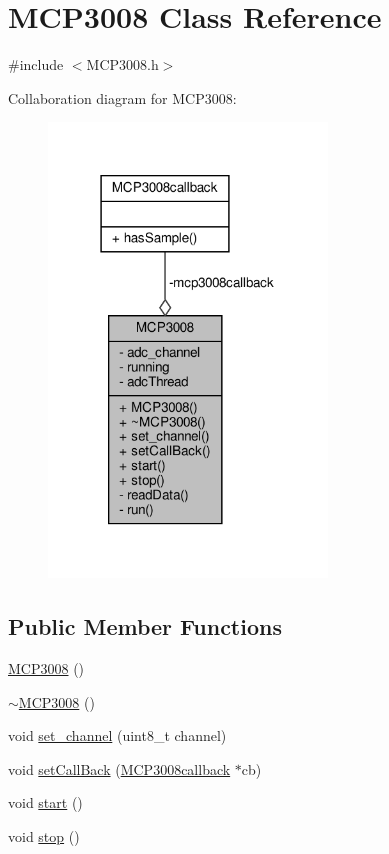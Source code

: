 \hypertarget{classMCP3008}{}\section{M\+C\+P3008 Class Reference}
\label{classMCP3008}


{\ttfamily \#include $<$M\+C\+P3008.\+h$>$}



Collaboration diagram for M\+C\+P3008\+:
\nopagebreak
\begin{figure}[H]
\begin{center}
\leavevmode
\includegraphics[width=210pt]{classMCP3008__coll__graph}
\end{center}
\end{figure}
\subsection*{Public Member Functions}
\begin{DoxyCompactItemize}
\item 
\hyperlink{classMCP3008_a31a9bfe04898e565154413cf17329859}{M\+C\+P3008} ()
\item 
\hyperlink{classMCP3008_a96d9ef77d32f0c4efd3b942c40322aeb}{$\sim$\+M\+C\+P3008} ()
\item 
void \hyperlink{classMCP3008_ad1893b9dd4dbbc2efbb57843871596fc}{set\+\_\+channel} (uint8\+\_\+t channel)
\item 
void \hyperlink{classMCP3008_abe098bf3c4c2e6a803c53297d84e3c1c}{set\+Call\+Back} (\hyperlink{classMCP3008callback}{M\+C\+P3008callback} $\ast$cb)
\item 
void \hyperlink{classMCP3008_a839bea8d430ee0852620c151c4467450}{start} ()
\item 
void \hyperlink{classMCP3008_add8fa4dafb68c227cd1ed269bd30603f}{stop} ()
\end{DoxyCompactItemize}
